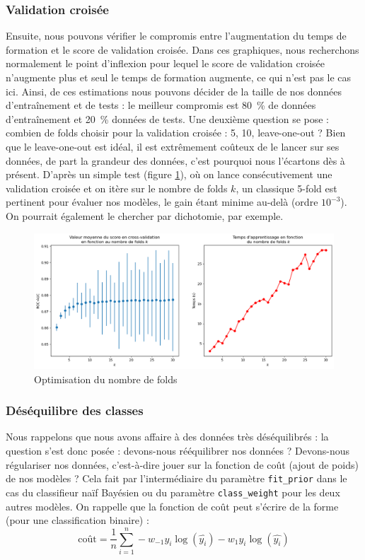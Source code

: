 \documentclass{article}
\begin{document}
\subsubsection{Validation croisée}
Ensuite, nous pouvons vérifier le compromis entre l'augmentation du temps de formation et le score de validation croisée. Dans ces graphiques, nous recherchons normalement le point d'inflexion pour lequel le score de validation croisée n'augmente plus et seul le temps de formation augmente, ce qui n'est pas le cas ici. Ainsi, de ces estimations nous pouvons décider de la taille de nos données d'entraînement et de tests : le meilleur compromis est 80~\% de données d'entraînement et 20~\% données de tests. Une deuxième question se pose : combien de folds choisir pour la validation croisée : 5, 10, leave-one-out ? Bien que le leave-one-out est idéal, il est extrêmement coûteux de le lancer sur ses données, de part la grandeur des données, c'est pourquoi nous l'écartons dès à présent. D'après un simple test (figure \ref{crossval_analysis_pres}), où on lance consécutivement une validation croisée et on itère sur le nombre de folds $k$, un classique 5-fold est pertinent pour évaluer nos modèles, le gain étant minime au-delà (ordre $10^{-3}$). On pourrait également le chercher par dichotomie, par exemple.

\begin{figure}[H]
    \centering
    \includegraphics[width=\textwidth]{./src/locuteur/crossval_analysis.png} 
    \caption{Optimisation du nombre de folds}
    \label{crossval_analysis_pres}
\end{figure}

\subsubsection{Déséquilibre des classes}

Nous rappelons que nous avons affaire à des données très déséquilibrés : la question s'est donc posée : devons-nous rééquilibrer nos données ? Devons-nous régulariser nos données, c'est-à-dire jouer sur la fonction de coût (ajout de poids) de nos modèles ? Cela fait par l'intermédiaire du paramètre \texttt{fit\_prior} dans le cas du classifieur naïf Bayésien ou du paramètre \texttt{class\_weight} pour les deux autres modèles. On rappelle que la fonction de coût peut s'écrire de la forme (pour une classification binaire) : 
$$\text{coût} = \frac 1n \sum_{i=1}^n -w_{-1} y_i \log (\hat{y_i}) -w_1 y_i \log (\hat{y_i})$$
\end{document}
